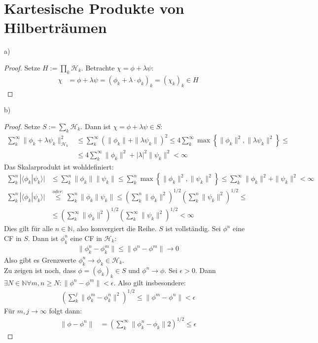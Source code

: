 \documentclass[a4paper,12pt]{article}
\newcommand{\brak}{}
\newcommand{\kla}{}
\newcommand{\klammer}{}
\begin{document}
\section{Kartesische Produkte von Hilberträumen}
a)
\begin{proof}
Setze $H:=\prod_k \mathcal{H}_k$. Betrachte $\chi=\phi+\lambda\psi$:
\begin{align*}
\chi&=\phi+\lambda\psi=(\phi_k+\lambda\cdot\phi_k)_k=(\chi_k)_k\in H
\end{align*}
\end{proof}
b)
\begin{proof}
Setze $S:=\sum_k\mathcal{H}_k$. Dann ist $\chi=\phi+\lambda\psi\in S$:
\begin{align*}
\sum_k^\infty\|\phi_k+\lambda\psi_k\|_{\mathcal{H}_k}^2&\le\sum_k^\infty(\|\phi_k\|+\|\lambda\psi_k\|)^2\le 4\sum_k^\infty\max\klammer\left\{ {\|\phi_k\|^2,\|\lambda\psi_k\|^2} \right\}\le\\
&\le 4\sum_k^\infty\|\phi_k\|^2+|\lambda|^2\|\psi_k\|^2<\infty
\end{align*}
Das Skalarprodukt ist wohldefiniert:
\begin{align*}
\sum_k^n  |\brak\langle {\phi_k}| {\psi_k}\rangle|&\le\sum_k^n \|\phi_k\|\|\psi_k\|\le \sum_k^n\max\klammer\left\{ {\|\phi_k\|^2,\|\psi_k\|^2} \right\}\le \sum_k^\infty\|\phi_k\|^2+\|\psi_k\|^2<\infty\\
\sum_k^n  |\brak\langle {\phi_k}| {\psi_k}\rangle|&\overset{oder:}{\le}\sum_k^n\|\phi_k\|\psi_k\|\le\kla\left( {\sum_k^n\|\phi_k\|^2} \right)^{1/2}\kla\left( {\sum_k^n\|\psi_k\|^2} \right)^{1/2}\le \\
&\le\kla\left( {\sum_k^\infty\|\phi_k\|^2} \right)^{1/2}\kla\left( {\sum_k^\infty\|\psi_k\|^2} \right)^{1/2}<\infty
\end{align*}
Dies gilt für alle $n\in\mathbb{N}$, also konvergiert die Reihe.
$S$ ist vollständig. Sei $\phi^n$ eine CF in $S$. Dann ist $\phi_k^n$ eine CF in $\mathcal{H}_k$:
\begin{align*}
\|\phi_k^n-\phi_k^m\|\le\|\phi^n-\phi^m\|\rightarrow 0
\end{align*}
Also gibt es Grenzwerte $\phi_k^n\rightarrow\phi_k\in\mathcal{H}_k$. \\
Zu zeigen ist noch, dass $\phi=(\phi_k)_k\in S$ und $\phi^n\rightarrow\phi$. Sei $\epsilon>0$. Dann $\exists N\in\mathbb{N}\forall m,n\ge N:\|\phi^n-\phi^m\|<\epsilon$. Also gilt insbesondere:
\begin{align*}
\kla\left( {\sum_k^j\|\phi_k^m-\phi_k^n\|^2} \right)^{1/2}\le\|\phi^m-\phi^n\|<\epsilon
\end{align*}
Für $m,j\rightarrow\infty$ folgt dann:
\begin{align*}
\|\phi-\phi^n\|&=\kla\left( {\sum_k^\infty\|\phi_k^n-\phi_k\|2} \right)^{1/2}\le\epsilon
\end{align*}
\end{proof}
\end{document}
